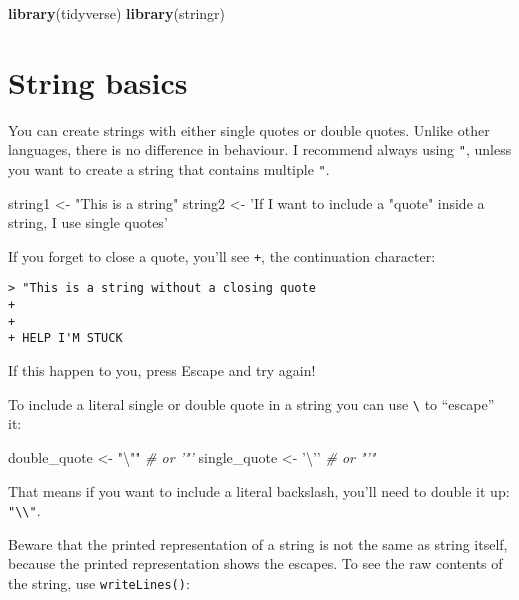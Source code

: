 \documentclass[]{book}
\newenvironment{Shaded}{\begin{snugshade}}{\end{snugshade}}
\newcommand{\KeywordTok}[1]{\textcolor[rgb]{0.13,0.29,0.53}{\textbf{{#1}}}}
\newcommand{\CharTok}[1]{\textcolor[rgb]{0.31,0.60,0.02}{{#1}}}
\newcommand{\StringTok}[1]{\textcolor[rgb]{0.31,0.60,0.02}{{#1}}}
\newcommand{\CommentTok}[1]{\textcolor[rgb]{0.56,0.35,0.01}{\textit{{#1}}}}
\newcommand{\NormalTok}[1]{{#1}}
\begin{document}
\begin{Shaded}
\begin{Highlighting}[]
\KeywordTok{library}\NormalTok{(tidyverse)}
\KeywordTok{library}\NormalTok{(stringr)}
\end{Highlighting}
\end{Shaded}

\hypertarget{string-basics}{\section{String
basics}\label{string-basics}}

You can create strings with either single quotes or double quotes.
Unlike other languages, there is no difference in behaviour. I recommend
always using \texttt{"}, unless you want to create a string that
contains multiple \texttt{"}.

\begin{Shaded}
\begin{Highlighting}[]
\NormalTok{string1 <-}\StringTok{ "This is a string"}
\NormalTok{string2 <-}\StringTok{ 'If I want to include a "quote" inside a string, I use single quotes'}
\end{Highlighting}
\end{Shaded}

If you forget to close a quote, you'll see \texttt{+}, the continuation
character:

\begin{verbatim}
> "This is a string without a closing quote
+ 
+ 
+ HELP I'M STUCK
\end{verbatim}

If this happen to you, press Escape and try again!

To include a literal single or double quote in a string you can use
\texttt{\textbackslash{}} to ``escape'' it:

\begin{Shaded}
\begin{Highlighting}[]
\NormalTok{double_quote <-}\StringTok{ "}\CharTok{\textbackslash{}"}\StringTok{"} \CommentTok{# or '"'}
\NormalTok{single_quote <-}\StringTok{ '}\CharTok{\textbackslash{}'}\StringTok{'} \CommentTok{# or "'"}
\end{Highlighting}
\end{Shaded}

That means if you want to include a literal backslash, you'll need to
double it up: \texttt{"\textbackslash{}\textbackslash{}"}.

Beware that the printed representation of a string is not the same as
string itself, because the printed representation shows the escapes. To
see the raw contents of the string, use \texttt{writeLines()}:
\end{document}
